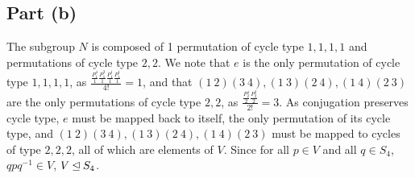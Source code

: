 \documentclass{article}
\begin{document}
\subsection*{Part (b)}
The subgroup $N$ is composed of 1 permutation of cycle type $1,1,1,1$ and permutations of cycle type $2,2$. We note that $e$ is the only permutation of cycle type $1,1,1,1$, as $\frac{\frac{P_1^4}{1}\frac{P_1^3}{1}\frac{P_1^1}{1}\frac{P_1^1}{1}}{4!} = 1$, and that $\left(1~2\right)\left(3~4\right), \left(1~3\right)\left(2~4\right), \left(1~4\right)\left(2~3\right)$ are the only permutations of cycle type $2,2$, as $\frac{\frac{P_2^4}{2}\frac{P_2^2}{2}}{2!} = 3$. As conjugation preserves cycle type, $e$ must be mapped back to itself, the only permutation of its cycle type, and $\left(1~2\right)\left(3~4\right), \left(1~3\right)\left(2~4\right), \left(1~4\right)\left(2~3\right)$ must be mapped to cycles of type $2,2,2$, all of which are elements of $V$. Since for all $p \in V$ and all $q \in S_4$, $qpq^{-1} \in V$, $V \unlhd S_4$.
\end{document}
